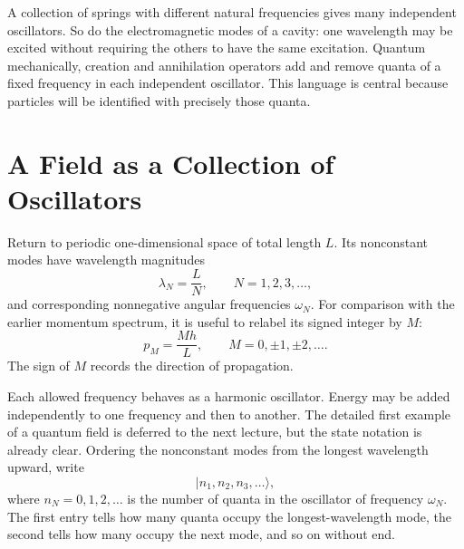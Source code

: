 \begin{classroomqa}
\end{classroomqa}

A collection of springs with different natural frequencies gives many independent oscillators. So do the electromagnetic modes of a cavity: one wavelength may be excited without requiring the others to have the same excitation. Quantum mechanically, creation and annihilation operators add and remove quanta of a fixed frequency in each independent oscillator. This language is central because particles will be identified with precisely those quanta.

\section{A Field as a Collection of Oscillators}

Return to periodic one-dimensional space of total length \(L\). Its nonconstant modes have wavelength magnitudes
\begin{equation}
\lambda_N=\frac{L}{N},
\qquad N=1,2,3,\ldots ,
\end{equation}
and corresponding nonnegative angular frequencies \(\omega_N\). For comparison with the earlier momentum spectrum, it is useful to relabel its signed integer by \(M\):
\begin{equation}
p_M=\frac{Mh}{L},
\qquad M=0,\pm1,\pm2,\ldots .
\end{equation}
The sign of \(M\) records the direction of propagation.

Each allowed frequency behaves as a harmonic oscillator. Energy may be added independently to one frequency and then to another. The detailed first example of a quantum field is deferred to the next lecture, but the state notation is already clear. Ordering the nonconstant modes from the longest wavelength upward, write
\begin{equation}
|n_1,n_2,n_3,\ldots\rangle,
\end{equation}
where \(n_N=0,1,2,\ldots\) is the number of quanta in the oscillator of frequency \(\omega_N\). The first entry tells how many quanta occupy the longest-wavelength mode, the second tells how many occupy the next mode, and so on without end.

